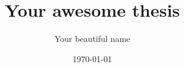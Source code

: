 \documentclass[doublespace,twoside]{StyleFiles/jthesis-v1}
\begin{document}

\title{Your awesome thesis}
\author{Your beautiful name}
\date{\today}

\maketitle







\contentsandlists




\startchapters





\appendix




% 
% 

\end{document}
